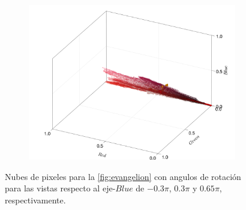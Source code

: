 \begin{figure}[ht!]
\begin{subfigure}[c]{0.3\textwidth}
    \end{subfigure}
    \begin{subfigure}[c]{0.3\textwidth}
        \centering
        \includegraphics[scale=0.09]{../pictures/pixel_cloud_eva_3}
    \end{subfigure}
    \caption{Nubes de pixeles para la \cref{fig:evangelion} con angulos de rotación para las vistas respecto al eje-$Blue$ de $-0.3\pi$, $0.3\pi$ y $0.65\pi$, respectivamente.}
    \label{fig:nube-pixeles-eva}
\end{figure}

